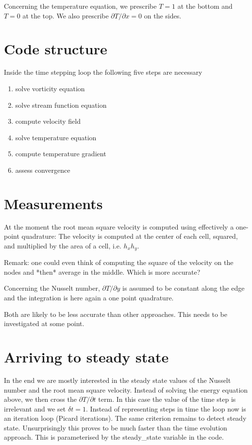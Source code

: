 Concerning the temperature equation, 
we prescribe $T=1$ at the bottom and $T=0$ at the top. 
We also prescribe $\partial T/\partial x=0$ on the sides.


\section*{Code structure}

Inside the time stepping loop the following five steps are necessary
\begin{enumerate}
\item solve vorticity equation
\item solve stream function equation
\item compute velocity field
\item solve temperature equation
\item compute temperature gradient
\item assess convergence
\end{enumerate}

\section*{Measurements}

At the moment the root mean square velocity is computed 
using effectively a one-point quadrature: The velocity 
is computed at the center of each cell, squared, and 
multiplied by the area of a cell, i.e. $h_x h_y$. 

Remark: one could even think of computing the square of the velocity 
on the nodes and *then* average in the middle. Which is more accurate?

Concerning the Nusselt number, $\partial T/\partial y$ is assumed to be constant
along the edge and the integration is here again a one point quadrature.

Both are likely to be less accurate than other approaches. This 
needs to be investigated at some point.

\section*{Arriving to steady state}

In the end we are mostly interested in the steady state values of the Nusselt number 
and the root mean square velocity. Instead of solving the energy equation above, 
we then cross the $\partial T/\partial t$ term. In this case the value of the 
time step is irrelevant and we set $\delta t=1$. Instead of representing 
steps in time the loop now is an iteration loop (Picard iterations). 
The same criterion remains to detect steady state. 
Unsurprisingly this proves to be much faster than the time evolution approach.
This is parameterised by the {\python steady\_state} variable in the code.

